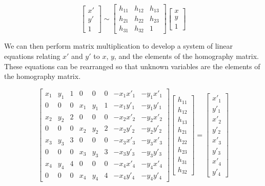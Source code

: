 \documentclass[11pt, letterpaper]{article}
\begin{document}
\[
\begin{bmatrix}
  x' \\  y' \\  1
\end{bmatrix}
\sim 
\begin{bmatrix}
  h_{11} & h_{12} & h_{13} \\
  h_{21} & h_{22} & h_{23} \\
  h_{31} & h_{32} & 1 
\end{bmatrix}
\begin{bmatrix}
  x \\  y \\  1
\end{bmatrix}
\]

We can then perform matrix multiplication to develop a system of
linear equations relating $x'$ and $y'$ to $x$, $y$, and the elements
of the homography matrix. These equations can be rearranged so that
unknown variables are the elements of the homography matrix.

\[
\begin{bmatrix}
  x_1 & y_1 & 1 & 0 & 0 & 0 & -x_1x'_1 & -y_1x'_1 \\
  0 & 0 & 0 & x_1 & y_1 & 1 & -x_1y'_1 & -y_1y'_1 \\
  x_2 & y_2 & 2 & 0 & 0 & 0 & -x_2x'_2 & -y_2x'_2 \\
  0 & 0 & 0 & x_2 & y_2 & 2 & -x_2y'_2 & -y_2y'_2 \\
  x_3 & y_3 & 3 & 0 & 0 & 0 & -x_3x'_3 & -y_3x'_3 \\
  0 & 0 & 0 & x_3 & y_3 & 3 & -x_3y'_3 & -y_3y'_3 \\
  x_4 & y_4 & 4 & 0 & 0 & 0 & -x_4x'_4 & -y_4x'_4 \\
  0 & 0 & 0 & x_4 & y_4 & 4 & -x_4y'_4 & -y_4y'_4 
\end{bmatrix}
\begin{bmatrix}
  h_{11} \\ h_{12} \\ h_{13} \\ h_{21} \\ h_{22} \\ h_{23} \\ h_{31} \\ h_{32} 
\end{bmatrix}
=
\begin{bmatrix}
  x'_1 \\ y'_1 \\ x'_2 \\ y'_2 \\ x'_3 \\ y'_3 \\ x'_4 \\ y'_4
\end{bmatrix}
\]
\end{document}
